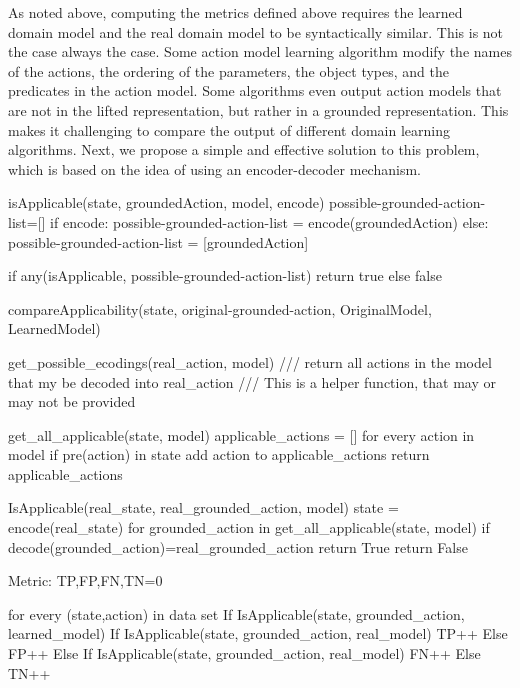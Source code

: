 As noted above, computing the metrics defined above requires the learned domain model and the real domain model to be syntactically similar. This is not the case always the case. 
Some action model learning algorithm modify the names of the actions, the ordering of the parameters, the object types, and the predicates in the action model. 
Some algorithms even output action models that are not in the lifted representation, but rather in a grounded representation. 
This makes it challenging to compare the output of different domain learning algorithms. 
Next, we propose a simple and effective solution to this problem, which is based on the idea of using an encoder-decoder mechanism. 




isApplicable(state, groundedAction, model, encode)
possible-grounded-action-list=[]
if encode:
    possible-grounded-action-list = encode(groundedAction)  
else:
     possible-grounded-action-list = [groundedAction]

if any(isApplicable, possible-grounded-action-list) return true
else false


compareApplicability(state, original-grounded-action, OriginalModel, LearnedModel)

    
get\_possible\_ecodings(real\_action, model) 
/// return all actions in the model that my be decoded into real\_action
/// This is a helper function, that may or may not be provided

get\_all\_applicable(state, model)
    applicable\_actions = []
    for every action in model
        if pre(action) in state
            add action to applicable\_actions
    return applicable\_actions
    
        
IsApplicable(real\_state, real\_grounded\_action, model) 
    state = encode(real\_state)
    for grounded\_action in get\_all\_applicable(state, model)  
        if decode(grounded\_action)=real\_grounded\_action 
            return True
    return False

Metric:
    TP,FP,FN,TN=0

    for every (state,action) in data set    
        If IsApplicable(state, grounded\_action, learned\_model)
            If IsApplicable(state, grounded\_action, real\_model)
                TP++
            Else
                FP++
        Else
            If IsApplicable(state, grounded\_action, real\_model)
                FN++
            Else
                TN++
    

    

